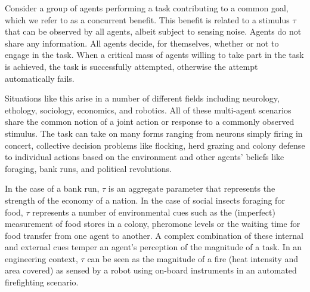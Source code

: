 \documentclass{nature}
\begin{document}
Consider a group of agents performing a task contributing to a common goal, which we refer to as a concurrent benefit. This benefit is related to a stimulus $\tau$ that can be observed by all agents, albeit subject to sensing noise. Agents do not share any information. All agents decide, for themselves, whether or not to engage in the task. When a critical mass of agents willing to take part in the task is achieved, the task is successfully attempted, otherwise the attempt automatically fails. 

Situations like this arise in a number of different fields including neurology\cite{Yoshida2010, Suzuki2015}, ethology\cite{Robinson1987, Gordon1996, Bonabeau1998, Theraulaz1998}, sociology\cite{Raafat2009}, economics\cite{Morris2000}, and robotics\cite{Martinoli1999, Krieger2000, Kube2000, Pynadath2002, Gerkey2003, Mataric2003, Gerkey2004, Kanakia2014}. All of these multi-agent scenarios share the common notion of a joint action or response to a commonly observed stimulus. The task can take on many forms ranging from neurons simply firing in concert, collective decision problems like flocking, herd grazing and colony defense to individual actions based on the environment and other agents' beliefs like foraging, bank runs, and political revolutions. 

In the case of a bank run\cite{Morris2000}, $\tau$ is an aggregate parameter that represents the strength of the economy of a nation. In the case of social insects foraging for food\cite{Bonabeau1996, Theraulaz1998, Krieger2000}, $\tau$ represents a number of environmental cues such as the (imperfect) measurement of food stores in a colony, pheromone levels\cite{Robinson1987} or the waiting time for food transfer from one agent to another\cite{Seeley1989}. A complex combination of these internal and external cues\cite{Gordon1996} temper an agent's perception of the magnitude of a task. In an engineering context, $\tau$ can be seen as the magnitude of a fire (heat intensity and area covered) as sensed by a robot using on-board instruments in an automated firefighting scenario\cite{Kanakia2014}. 
\end{document}
